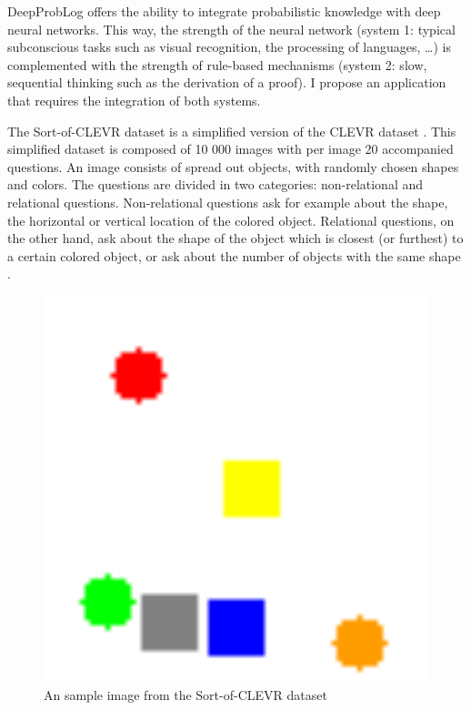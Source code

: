 \documentclass{setup}
\begin{document}
	\maketitle

	DeepProbLog offers the ability to integrate probabilistic knowledge with deep neural networks. This way, the strength of the neural network (system 1: typical subconscious tasks such as visual recognition, the processing of languages, \dots) is complemented with the strength of rule-based mechanisms (system 2: slow, sequential thinking such as the derivation of a proof). I propose an application that requires the integration of both systems.

	The Sort-of-CLEVR dataset is a simplified version of the CLEVR dataset \cite{clevr_dataset}. This simplified dataset is composed of 10 000 images with per image 20 accompanied questions. An image consists of spread out objects, with randomly chosen shapes and colors. The questions are divided in two categories: non-relational and relational questions. Non-relational questions ask for example about the shape, the horizontal or vertical location of the colored object. Relational questions, on the other hand, ask about the shape of the object which is closest (or furthest) to a certain colored object, or ask about the number of objects with the same shape \cite{sort_of_clevr_dataset}.

	\begin{figure}[htbp]
		\centerline{\includegraphics[scale=.48]{example_image_of_dataset.png}}
		\caption{An sample image from the Sort-of-CLEVR dataset \cite{sort_of_clevr_dataset}}
		\label{image:example_image_of_dataset}
		\end{figure}
\end{document}
